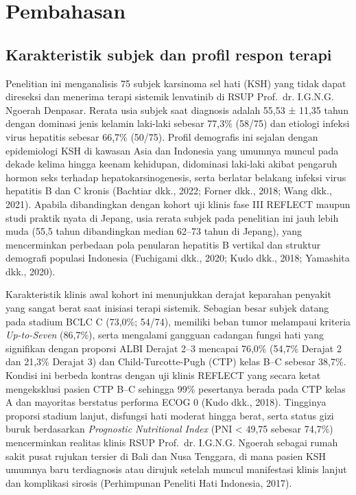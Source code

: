 \documentclass[
  indonesian,
]{report}
\begin{document}
\section{Pembahasan}\label{pembahasan}

\subsection{Karakteristik subjek dan profil respon
terapi}\label{karakteristik-subjek-dan-profil-respon-terapi}

Penelitian ini menganalisis 75 subjek karsinoma sel hati (KSH) yang
tidak dapat direseksi dan menerima terapi sistemik lenvatinib di RSUP
Prof.~dr. I.G.N.G. Ngoerah Denpasar. Rerata usia subjek saat diagnosis
adalah 55,53 ± 11,35 tahun dengan dominasi jenis kelamin laki-laki
sebesar 77,3\% (58/75) dan etiologi infeksi virus hepatitis sebesar
66,7\% (50/75). Profil demografis ini sejalan dengan epidemiologi KSH di
kawasan Asia dan Indonesia yang umumnya muncul pada dekade kelima hingga
keenam kehidupan, didominasi laki-laki akibat pengaruh hormon seks
terhadap hepatokarsinogenesis, serta berlatar belakang infeksi virus
hepatitis B dan C kronis (Bachtiar dkk., 2022; Forner dkk., 2018; Wang
dkk., 2021). Apabila dibandingkan dengan kohort uji klinis fase III
REFLECT maupun studi praktik nyata di Jepang, usia rerata subjek pada
penelitian ini jauh lebih muda (55,5 tahun dibandingkan median 62--73
tahun di Jepang), yang mencerminkan perbedaan pola penularan hepatitis B
vertikal dan struktur demografi populasi Indonesia (Fuchigami dkk.,
2020; Kudo dkk., 2018; Yamashita dkk., 2020).

Karakteristik klinis awal kohort ini menunjukkan derajat keparahan
penyakit yang sangat berat saat inisiasi terapi sistemik. Sebagian besar
subjek datang pada stadium BCLC C (73,0\%; 54/74), memiliki beban tumor
melampaui kriteria \emph{Up-to-Seven} (86,7\%), serta mengalami gangguan
cadangan fungsi hati yang signifikan dengan proporsi ALBI Derajat 2--3
mencapai 76,0\% (54,7\% Derajat 2 dan 21,3\% Derajat 3) dan
Child-Turcotte-Pugh (CTP) kelas B--C sebesar 38,7\%. Kondisi ini berbeda
kontras dengan uji klinis REFLECT yang secara ketat mengeksklusi pasien
CTP B--C sehingga 99\% pesertanya berada pada CTP kelas A dan mayoritas
berstatus performa ECOG 0 (Kudo dkk., 2018). Tingginya proporsi stadium
lanjut, disfungsi hati moderat hingga berat, serta status gizi buruk
berdasarkan \emph{Prognostic Nutritional Index} (PNI \textless{} 49,75
sebesar 74,7\%) mencerminkan realitas klinis RSUP Prof.~dr. I.G.N.G.
Ngoerah sebagai rumah sakit pusat rujukan tersier di Bali dan Nusa
Tenggara, di mana pasien KSH umumnya baru terdiagnosis atau dirujuk
setelah muncul manifestasi klinis lanjut dan komplikasi sirosis
(Perhimpunan Peneliti Hati Indonesia, 2017).
\end{document}
